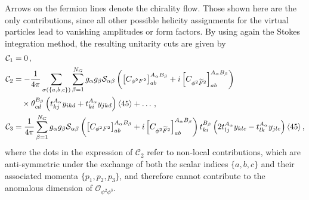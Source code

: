 Arrows on the fermion lines denote the chirality flow.
Those shown here are the only contributions, since all other possible helicity assignments for
the virtual particles lead to vanishing amplitudes or form factors.
By using again the Stokes integration method, the resulting unitarity cuts are
given by
\begin{align}
    \mathcal C_1 &= 0\,,
    \\
    \mathcal C_2 &= -\frac{1}{4\pi}\sum_{\sigma(\{a,b,c\})}\sum_{\beta=1}^{N_G}
    g_\alpha g_\beta \mathcal S_{\alpha\beta}
    \left(\left[C_{\phi^2F^2}\right]^{A_\alpha B_\beta}_{ab}
    + i \left[C_{\phi^2\widetilde F^2}\right]^{A_\alpha B_\beta}_{ab} \right)\nonumber \\
    &\quad\times\theta^{B_\beta}_{cd}\left(t^{A_\alpha}_{kj}y_{ikd}+t^{A_\alpha}_{ki}y_{jkd}\right)\langle 4 5 \rangle+\dotsc \,,
    \\
    \mathcal C_3 &= \frac{1}{4\pi}\sum_{\beta=1}^{N_G}g_\alpha g_\beta \mathcal S_{\alpha\beta}
    \left(\left[C_{\phi^2F^2}\right]^{A_\alpha B_\beta}_{ab}
    + i \left[C_{\phi^2\widetilde F^2}\right]^{A_\alpha B_\beta}_{ab} \right)
    t^{B_\beta}_{ki}\left(2t^{A_\alpha}_{lj}y_{klc}-t^{A_\alpha}_{lk}y_{jlc}\right)\langle 4 5 \rangle \,,
\end{align}
where the dots in the expression of $\mathcal C_2$ refer to non-local contributions, which are
anti-symmetric under the exchange of both the scalar indices $\{a,b,c\}$ and their associated
momenta $\{p_1,p_2,p_3\}$, and therefore cannot contribute to the anomalous dimension of
$\mathcal O_{\psi^2\phi^3}$.

